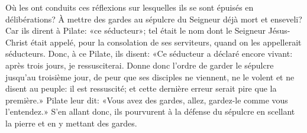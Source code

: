 Où les ont conduits ces réflexions
	sur lesquelles ils se sont épuisés en délibérations?
À mettre des gardes au sépulcre du Seigneur déjà mort et enseveli?
Car ils dirent à Pilate: «ce séducteur»;
	tel était le nom dont le Seigneur Jésus-Christ était appelé,
	pour la consolation de ses serviteurs, quand on les appellerait séducteurs.
Donc, à ce Pilate, ils disent: «Ce séducteur a déclaré encore vivant:
	après trois jours, je ressusciterai.
Donne donc l’ordre de garder le sépulcre jusqu’au troisième jour,
	de peur que ses disciples ne viennent,
	ne le volent et ne disent au peuple: il est ressuscité;
	et cette dernière erreur serait pire que la première.»
Pilate leur dit: «Vous avez des gardes,
	allez, gardez-le comme vous l’entendez.»
S’en allant donc, ils pourvurent à la défense du sépulcre
	en scellant la pierre et en y mettant des gardes.
